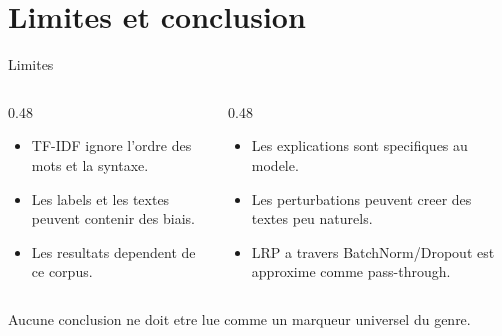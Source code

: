 \documentclass[10pt]{beamer}
\begin{document}
\section{Limites et conclusion}

\begin{frame}{Limites}
    \begin{columns}[T]
        \begin{column}{0.48\textwidth}
            \begin{tcolorbox}[colback=lightred!20, colframe=redforsnnu, title=Representation et donnees]
                \begin{itemize}\small
                    \item TF-IDF ignore l'ordre des mots et la syntaxe.
                    \item Les labels et les textes peuvent contenir des biais.
                    \item Les resultats dependent de ce corpus.
                \end{itemize}
            \end{tcolorbox}
        \end{column}
        \begin{column}{0.48\textwidth}
            \begin{tcolorbox}[colback=middledered!20, colframe=darkred, title=Explicabilite]
                \begin{itemize}\small
                    \item Les explications sont specifiques au modele.
                    \item Les perturbations peuvent creer des textes peu naturels.
                    \item LRP a travers BatchNorm/Dropout est approxime comme pass-through.
                \end{itemize}
            \end{tcolorbox}
        \end{column}
    \end{columns}
    \vspace{0.2cm}
    \centering
    \small Aucune conclusion ne doit etre lue comme un marqueur universel du genre.
\end{frame}
\end{document}
